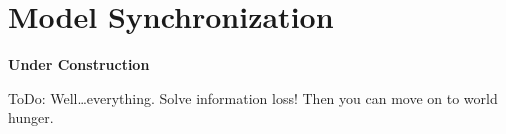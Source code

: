 \newpage
\section{Model Synchronization}
\genHeader

{\bf \large \hspace{4.5cm} Under Construction}

ToDo: Well\ldots everything. Solve information loss! Then you can move on to world hunger.